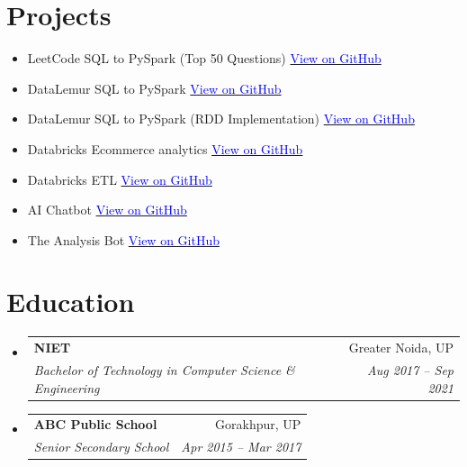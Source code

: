 \documentclass[letterpaper,11pt]{article}
\makeatletter
\newcommand{\resumeSubheading}[4]{
  \vspace{-2pt}\item
    \begin{tabular*}{0.97\textwidth}[t]{l@{\extracolsep{\fill}}r}
      \textbf{#1} & #2 \\
      \textit{\small#3} & \textit{\small #4} \\
    \end{tabular*}\vspace{-7pt}
}
\newcommand{\resumeSubHeadingListStart}{\begin{itemize}[leftmargin=0.15in, label={}]}
\newcommand{\resumeSubHeadingListEnd}{\end{itemize}}
\makeatother
\begin{document}
\section{Projects}
  \begin{itemize}[leftmargin=0.15in, label={}]

    \item{LeetCode SQL to PySpark (Top 50 Questions) \hfill
    \href{https://github.com/himanshuclub88/LeetcodeSQL_usingPYSPARK}{\textcolor{blue}{View on GitHub \faExternalLink}}}

    \item{DataLemur SQL to PySpark \hfill
    \href{https://github.com/himanshuclub88/DatalemurSQL_usingPYSPARK}{\textcolor{blue}{View on GitHub \faExternalLink}}}

    \item{DataLemur SQL to PySpark (RDD Implementation) \hfill
    \href{https://github.com/himanshuclub88/DatalemurSQL_usingPySparkRDD}{\textcolor{blue}{View on GitHub \faExternalLink}}}

    \item{Databricks Ecommerce analytics \hfill
    \href{https://github.com/himanshuclub88/DATABRICKS-ECOMMERCE_ANALYTICS_DASHBOARDS}{\textcolor{blue}{View on GitHub \faExternalLink}}}

    \item{Databricks ETL \hfill
    \href{https://github.com/himanshuclub88/DATABRICKS-ETL}{\textcolor{blue}{View on GitHub \faExternalLink}}}

    \item{AI Chatbot \hfill
    \href{https://github.com/himanshuclub88/Chatbot}{\textcolor{blue}{View on GitHub \faExternalLink}}}

    \item{The Analysis Bot \hfill
    \href{https://github.com/himanshuclub88/The_Analysis_Bot}{\textcolor{blue}{View on GitHub \faExternalLink}}}

  \end{itemize}


\section{Education}
  \resumeSubHeadingListStart
    \resumeSubheading
      {NIET}{Greater Noida, UP}
      {Bachelor of Technology in Computer Science \& Engineering}{Aug 2017 -- Sep 2021}
    \resumeSubheading
      {ABC Public School}{Gorakhpur, UP}
      {Senior Secondary School}{Apr 2015 -- Mar 2017}

  \resumeSubHeadingListEnd


 
\end{document}

